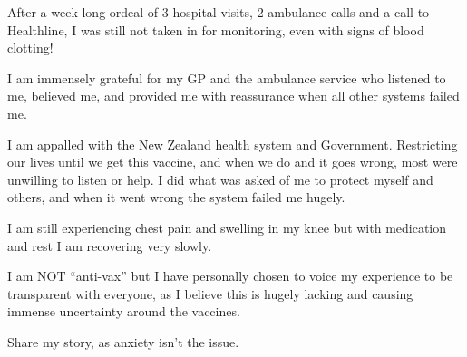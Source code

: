 After a week long ordeal of 3 hospital visits, 2 ambulance calls and a call to
Healthline, I was still not taken in for monitoring, even with signs of blood
clotting!

I am immensely grateful for my GP and the ambulance service who listened to me,
believed me, and provided me with reassurance when all other systems failed me.

I am appalled with the New Zealand health system and Government. Restricting our
lives until we get this vaccine, and when we do and it goes wrong, most were
unwilling to listen or help. I did what was asked of me to protect myself and
others, and when it went wrong the system failed me hugely.

I am still experiencing chest pain and swelling in my knee but with medication
and rest I am recovering very slowly.

I am NOT ``anti-vax'' but I have personally chosen to voice my experience to be
transparent with everyone, as I believe this is hugely lacking and causing
immense uncertainty around the vaccines.

Share my story, as anxiety isn’t the issue.
